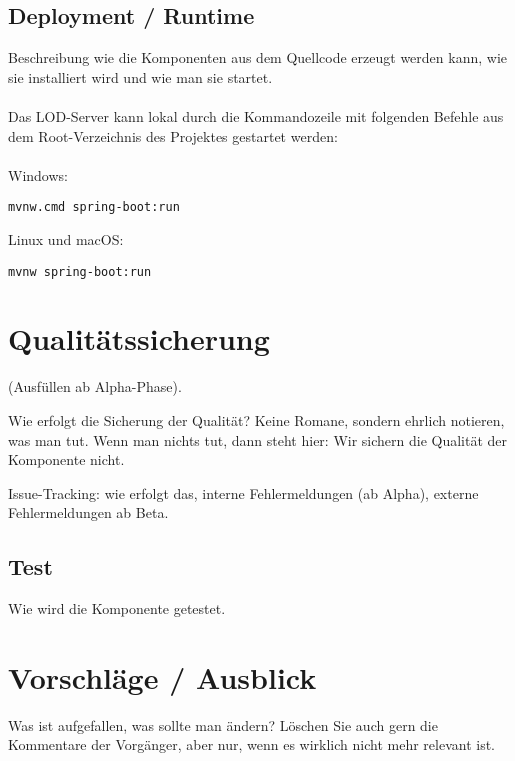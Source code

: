 \subsection{Deployment / Runtime}
Beschreibung wie die Komponenten aus dem Quellcode erzeugt werden kann,
wie sie installiert wird und wie man sie startet.\\
\\
Das LOD-Server kann lokal durch die Kommandozeile mit folgenden Befehle aus 
dem Root-Verzeichnis des Projektes gestartet werden:\\
\\
Windows:
\begin{lstlisting}
mvnw.cmd spring-boot:run
\end{lstlisting}
Linux und macOS:
\begin{lstlisting}
mvnw spring-boot:run
\end{lstlisting}

\section{Qualitätssicherung}
(Ausfüllen ab Alpha-Phase).

Wie erfolgt die Sicherung der Qualität? Keine Romane, sondern ehrlich notieren,
was man tut. Wenn man nichts tut, dann steht hier: Wir sichern die Qualität der
Komponente nicht.

Issue-Tracking: wie erfolgt das, interne Fehlermeldungen (ab Alpha), 
externe Fehlermeldungen ab Beta.

\subsection{Test}
Wie wird die Komponente getestet.

\section{Vorschläge / Ausblick}
Was ist aufgefallen, was sollte man ändern? Löschen Sie auch gern die Kommentare
der Vorgänger, aber nur, wenn es wirklich nicht mehr relevant ist.

